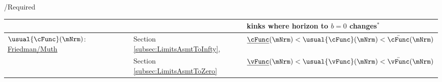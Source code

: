 \documentclass[\econtexRoot/BufferStockTheory]{subfiles}
\begin{document}
\begin{verbatimwrite}{\TableDir/Required}
\begin{table}
{\begin{tabular}{|l|l|l|}
    \\                                                                                                                        &                                         & kinks where horizon to $b=0$ changes$^{\ast}$
    \\ \hline\hline \multicolumn{1}{|l|}{$\usual{\cFunc}(\mNrm)$:  \href{https://\owner.github.io/BufferStockTheory\#Uncertainty-Modified-Conditions}{Friedman/Muth}
  }                                                                                                                       & Section \ref{subsec:LimitsAsmtToInfty}, & $\underline{\cFunc}(\mNrm) < \usual{\cFunc}(\mNrm) < \bar{\cFunc}(\mNrm)$ %
    \\                                                                                                                      & Section \ref{subsec:LimitsAsmtToZero}   & $\underline{\vFunc}(\mNrm) < \usual{\vFunc}(\mNrm) < \bar{\vFunc}(\mNrm)$ %
                                                                                  

\end{tabular}}
\end{table}
\end{verbatimwrite}
\end{document}
